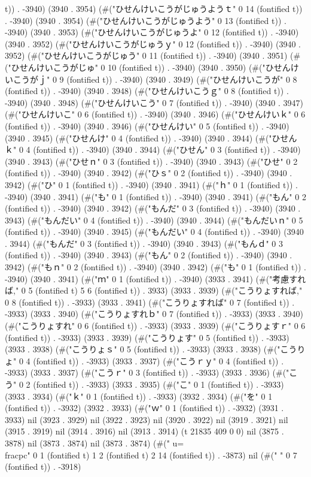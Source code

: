 t)) . -3940) (3940 . 3954) (#("ひせんけいこうがじゅうようｔ" 0 14 (fontified t)) . -3940) (3940 . 3954) (#("ひせんけいこうがじゅうよう" 0 13 (fontified t)) . -3940) (3940 . 3953) (#("ひせんけいこうがじゅうよ" 0 12 (fontified t)) . -3940) (3940 . 3952) (#("ひせんけいこうがじゅうｙ" 0 12 (fontified t)) . -3940) (3940 . 3952) (#("ひせんけいこうがじゅう" 0 11 (fontified t)) . -3940) (3940 . 3951) (#("ひせんけいこうがじゅ" 0 10 (fontified t)) . -3940) (3940 . 3950) (#("ひせんけいこうがｊ" 0 9 (fontified t)) . -3940) (3940 . 3949) (#("ひせんけいこうが" 0 8 (fontified t)) . -3940) (3940 . 3948) (#("ひせんけいこうｇ" 0 8 (fontified t)) . -3940) (3940 . 3948) (#("ひせんけいこう" 0 7 (fontified t)) . -3940) (3940 . 3947) (#("ひせんけいこ" 0 6 (fontified t)) . -3940) (3940 . 3946) (#("ひせんけいｋ" 0 6 (fontified t)) . -3940) (3940 . 3946) (#("ひせんけい" 0 5 (fontified t)) . -3940) (3940 . 3945) (#("ひせんけ" 0 4 (fontified t)) . -3940) (3940 . 3944) (#("ひせんｋ" 0 4 (fontified t)) . -3940) (3940 . 3944) (#("ひせん" 0 3 (fontified t)) . -3940) (3940 . 3943) (#("ひせｎ" 0 3 (fontified t)) . -3940) (3940 . 3943) (#("ひせ" 0 2 (fontified t)) . -3940) (3940 . 3942) (#("ひｓ" 0 2 (fontified t)) . -3940) (3940 . 3942) (#("ひ" 0 1 (fontified t)) . -3940) (3940 . 3941) (#("ｈ" 0 1 (fontified t)) . -3940) (3940 . 3941) (#("も" 0 1 (fontified t)) . -3940) (3940 . 3941) (#("もん" 0 2 (fontified t)) . -3940) (3940 . 3942) (#("もんだ" 0 3 (fontified t)) . -3940) (3940 . 3943) (#("もんだい" 0 4 (fontified t)) . -3940) (3940 . 3944) (#("もんだいｎ" 0 5 (fontified t)) . -3940) (3940 . 3945) (#("もんだい" 0 4 (fontified t)) . -3940) (3940 . 3944) (#("もんだ" 0 3 (fontified t)) . -3940) (3940 . 3943) (#("もんｄ" 0 3 (fontified t)) . -3940) (3940 . 3943) (#("もん" 0 2 (fontified t)) . -3940) (3940 . 3942) (#("もｎ" 0 2 (fontified t)) . -3940) (3940 . 3942) (#("も" 0 1 (fontified t)) . -3940) (3940 . 3941) (#("ｍ" 0 1 (fontified t)) . -3940) (3933 . 3941) (#("考慮すれば," 0 5 (fontified t) 5 6 (fontified t)) . 3933) (3933 . 3939) (#("こうりょすれば," 0 8 (fontified t)) . -3933) (3933 . 3941) (#("こうりょすれば" 0 7 (fontified t)) . -3933) (3933 . 3940) (#("こうりょすれｂ" 0 7 (fontified t)) . -3933) (3933 . 3940) (#("こうりょすれ" 0 6 (fontified t)) . -3933) (3933 . 3939) (#("こうりょすｒ" 0 6 (fontified t)) . -3933) (3933 . 3939) (#("こうりょす" 0 5 (fontified t)) . -3933) (3933 . 3938) (#("こうりょｓ" 0 5 (fontified t)) . -3933) (3933 . 3938) (#("こうりょ" 0 4 (fontified t)) . -3933) (3933 . 3937) (#("こうｒｙ" 0 4 (fontified t)) . -3933) (3933 . 3937) (#("こうｒ" 0 3 (fontified t)) . -3933) (3933 . 3936) (#("こう" 0 2 (fontified t)) . -3933) (3933 . 3935) (#("こ" 0 1 (fontified t)) . -3933) (3933 . 3934) (#("ｋ" 0 1 (fontified t)) . -3933) (3932 . 3934) (#("を" 0 1 (fontified t)) . -3932) (3932 . 3933) (#("ｗ" 0 1 (fontified t)) . -3932) (3931 . 3933) nil (3923 . 3929) nil (3922 . 3923) nil (3920 . 3922) nil (3919 . 3921) nil (3915 . 3919) nil (3914 . 3916) nil (3913 . 3914) (t 21835 409 0 0) nil (3875 . 3878) nil (3873 . 3874) nil (3873 . 3874) (#(" u=\\frac{p}{c}" 0 1 (fontified t) 1 2 (fontified t) 2 14 (fontified t)) . -3873) nil (#("       " 0 7 (fontified t)) . -3918) 